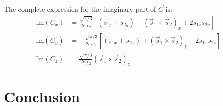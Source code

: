 \documentclass[12pt]{article}
\begin{document}
	The complete expression for the imaginary part of $\vec{C}$ is:
	\begin{align*}
	\text{Im}(C_x) &= \frac{\sqrt{\pi/3}}{2c_1c_2} \left[ (s_{1y} + s_{2y}) + (\vec{s}_1 \times \vec{s}_2)_x + 2 s_{1z}s_{2y} \right] \\
	\text{Im}(C_y) &= -\frac{\sqrt{\pi/3}}{2c_1c_2} \left[ (s_{1x} + s_{2x}) + (\vec{s}_1 \times \vec{s}_2)_y + 2 s_{1x}s_{2z} \right] \\
	\text{Im}(C_z) &= \frac{\sqrt{\pi/3}}{2c_1c_2} (\vec{s}_1 \times \vec{s}_2)_z
	\end{align*}
	\section{Conclusion}
	
	
	
\end{document}
